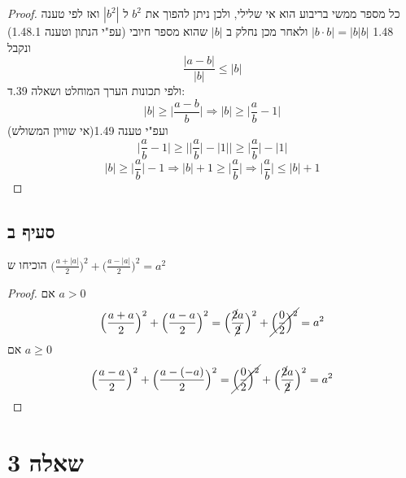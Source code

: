 \documentclass{article}
\begin{document}
	\begin{proof}

		כל מספר ממשי בריבוע הוא אי שלילי, ולכן ניתן להפוך את $b^2$ ל $|b^2|$ ואז לפי טענה 1.48 $|b \cdot b| = |b|b|$ ולאחר מכן נחלק ב $|b|$ שהוא מספר חיובי (עפ"י הנתון וטענה 1.48.1) ונקבל
		\[ \frac{|a-b| }{|b|} \leq |b| \]
		ולפי תכונות הערך המוחלט ושאלה 39.ד:
		\[
			|b| \geq \Big| \frac{a-b}{b} \Big| \Rightarrow
		 	|b| \geq  \Big| \frac{a}{b}-1 \Big|
		 \]
		 ועפ"י טענה 1.49(אי שוויון המשולש)
		 \[
		 	\Big| \frac{a}{b}-1 \Big| \geq
		 	\bigg| \Big| \frac{a}{b} \Big| - |1| \bigg| \geq
		 	\Big| \frac{a}{b} \Big| - |1| \]
		 \[
		 	|b| \geq \Big| \frac{a}{b} \Big| -1 \Rightarrow
		 	|b| + 1 \geq \Big| \frac{a}{b}  \Big| \Rightarrow
		 	\Big| \frac{a}{b} \Big| \leq |b| + 1
		  \]

	\end{proof}

	\subsection*{סעיף ב}
	הוכיחו ש
	$\big( \frac{a + |a|}{2} \big)^2 + \big( \frac{a - |a|}{2} \big)^2 = a^2$
	\begin{proof}
		אם $a > 0$
		\[
			\Big( \frac{a+a}{2} \Big)^2 + \Big( \frac{a-a}{2} \Big) ^2 =
			\Big( \frac{\cancel{2}a}{\cancel{2}} \Big)^2 + \cancel{\Big( \frac{0}{2} \Big)^2} = a^2
		\]
				אם $a \geq 0$
		\[
		\Big( \frac{a-a}{2} \Big)^2 + \Big( \frac{a-(-a)}{2} \Big) ^2 =
		\cancel{\Big( \frac{0}{2} \Big)^2} + \Big( \frac{\cancel{2}a}{\cancel{2}} \Big)^2 = a^2
		\]
	\end{proof}

	\section*{שאלה 3}
\end{document}
